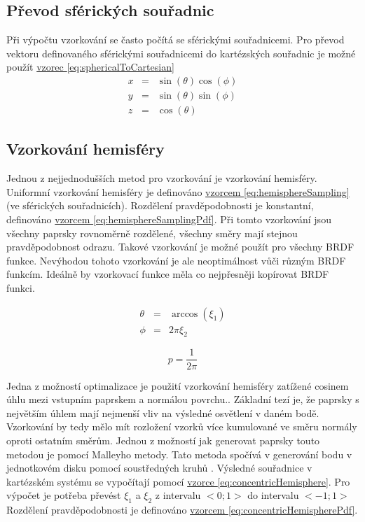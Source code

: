 \documentclass[czech,master,dept460,male,cpp,cpdeclaration]{diploma}
\newcommand{\randU}{\xi_{1}}
\newcommand{\randV}{\xi_{2}}
\begin{document}
\subsection{Převod sférických souřadnic}
Při výpočtu vzorkování se často počítá se sférickými souřadnicemi. Pro převod vektoru definovaného sférickými souřadnicemi do kartézských souřadnic je možné použít \hyperref[eq:sphericalToCartesian]{vzorec \ref{eq:sphericalToCartesian}}
\begin{eqnarray}
    x & = & \sin(\theta)\cos(\phi)\nonumber \\
    y & = & \sin(\theta)\sin(\phi)\nonumber \\
    z & = & \cos(\theta)\label{eq:sphericalToCartesian}
\end{eqnarray}

\subsection{Vzorkování hemisféry} \label{sec:hemisphere}
Jednou z nejjednodušších metod pro vzorkování je vzorkování hemisféry. Uniformní vzorkování hemisféry je definováno \hyperref[eq:hemisphereSampling]{vzorcem \ref{eq:hemisphereSampling}} (ve sférických souřadnicích). Rozdělení pravděpodobnosti je konstantní, definováno \hyperref[eq:hemisphereSamplingPdf]{vzorcem \ref{eq:hemisphereSamplingPdf}}. Při tomto vzorkování jsou všechny paprsky rovnoměrně rozdělené, všechny směry mají stejnou pravděpodobnost odrazu. Takové vzorkování je možné použít pro všechny BRDF funkce. Nevýhodou tohoto vzorkování je ale neoptimálnost vůči různým BRDF funkcím. Ideálně by vzorkovací funkce měla co nejpřesněji kopírovat BRDF funkci. \par

\begin{eqnarray}
    \theta & = & \arccos(\randU) \nonumber \\
    \phi & = & 2\pi\randV \label{eq:hemisphereSampling}
\end{eqnarray}

\begin{equation} \label{eq:hemisphereSamplingPdf}
    p = \frac{1}{2\pi}
\end{equation}

Jedna z možností optimalizace je použití vzorkování hemisféry zatížené cosinem úhlu mezi vstupním paprskem a normálou povrchu.. Základní tezí je, že paprsky s největším úhlem mají nejmenší vliv na výsledné osvětlení v daném bodě. Vzorkování by tedy mělo mít rozložení vzorků více kumulované ve směru normály oproti ostatním směrům. Jednou z možností jak generovat paprsky touto metodou je pomocí Malleyho metody. Tato metoda spočívá v generování bodu v jednotkovém disku pomocí soustředných kruhů \cite{PHARR2017747}. Výsledné souřadnice v kartézském systému se vypočítají pomocí \hyperref[eq:concentricHemisphere]{vzorce \ref{eq:concentricHemisphere}}. Pro výpočet je potřeba převést $\randU$ a $\randV$ z intervalu $<0;1>$ do intervalu $<-1;1>$  Rozdělení pravděpodobnosti je definováno \hyperref[eq:concentricHemisphere]{vzorcem \ref{eq:concentricHemispherePdf}}.
\end{document}

